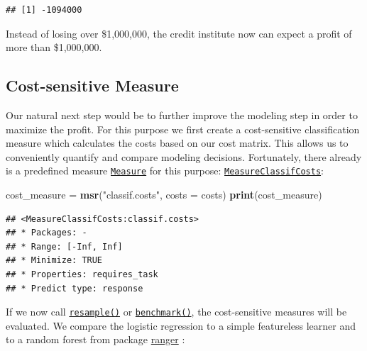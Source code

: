 \documentclass[]{scrbook}
\newenvironment{Shaded}{\begin{snugshade}}{\end{snugshade}}
\newcommand{\DataTypeTok}[1]{\textcolor[rgb]{0.13,0.29,0.53}{#1}}
\newcommand{\DecValTok}[1]{\textcolor[rgb]{0.00,0.00,0.81}{#1}}
\newcommand{\KeywordTok}[1]{\textcolor[rgb]{0.13,0.29,0.53}{\textbf{#1}}}
\newcommand{\NormalTok}[1]{#1}
\newcommand{\OperatorTok}[1]{\textcolor[rgb]{0.81,0.36,0.00}{\textbf{#1}}}
\newcommand{\StringTok}[1]{\textcolor[rgb]{0.31,0.60,0.02}{#1}}
\renewenvironment{Shaded} {\begin{snugshade}\small} {\end{snugshade}}
\begin{document}
\begin{verbatim}
## [1] -1094000
\end{verbatim}

Instead of losing over \$1,000,000, the credit institute now can expect a profit of more than \$1,000,000.

\hypertarget{cost-sensitive-measure}{%
\subsection{Cost-sensitive Measure}\label{cost-sensitive-measure}}

Our natural next step would be to further improve the modeling step in order to maximize the profit.
For this purpose we first create a cost-sensitive classification measure which calculates the costs based on our cost matrix.
This allows us to conveniently quantify and compare modeling decisions.
Fortunately, there already is a predefined measure \href{https://mlr3.mlr-org.com/reference/Measure.html}{\texttt{Measure}} for this purpose: \href{https://mlr3.mlr-org.com/reference/mlr_measures_classif.costs.html}{\texttt{MeasureClassifCosts}}:

\begin{Shaded}
\begin{Highlighting}[]
\NormalTok{cost_measure =}\StringTok{ }\KeywordTok{msr}\NormalTok{(}\StringTok{"classif.costs"}\NormalTok{, }\DataTypeTok{costs =}\NormalTok{ costs)}
\KeywordTok{print}\NormalTok{(cost_measure)}
\end{Highlighting}
\end{Shaded}

\begin{verbatim}
## <MeasureClassifCosts:classif.costs>
## * Packages: -
## * Range: [-Inf, Inf]
## * Minimize: TRUE
## * Properties: requires_task
## * Predict type: response
\end{verbatim}

If we now call \href{https://mlr3.mlr-org.com/reference/resample.html}{\texttt{resample()}} or \href{https://mlr3.mlr-org.com/reference/benchmark.html}{\texttt{benchmark()}}, the cost-sensitive measures will be evaluated.
We compare the logistic regression to a simple featureless learner and to a random forest from package \href{https://cran.r-project.org/package=ranger}{ranger} :

\begin{Shaded}
\end{Shaded}
\end{document}
